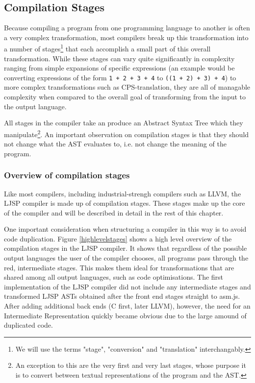 \documentclass[11pt]{report}
\begin{document}
\subsection{Compilation Stages}
Because compiling a program from one programming language to another is often a very complex transformation, most compilers break up this transformation into a number of stages\footnote{We will use the terms "stage", "conversion" and "translation" interchangably.} that each accomplish a small part of this overall transformation. While these stages can vary quite significantly in complexity ranging from simple expansions of specific expressions (an example would be converting expressions of the form \hbox{\texttt{1 + 2 + 3 + 4}} to \hbox{\texttt{((1 + 2) + 3) + 4}}) to more complex transformations such as CPS-translation, they are all of managable complexity when compared to the overall goal of transforming from the input to the output language.

All stages in the compiler take an produce an Abstract Syntax Tree which they manipulate\footnote{An exception to this are the very first and very last stages, whose purpose it is to convert between textual representations of the program and the AST.}. An important observation on compilation stages is that they should not change what the AST evaluates to, i.e. not change the meaning of the program.

\subsubsection{Overview of compilation stages}
Like most compilers, including industrial-strengh compilers such as LLVM, the LJSP compiler is made up of compilation stages. These stages make up the core of the compiler and will be described in detail in the rest of this chapter.

One important consideration when structuring a compiler in this way is to avoid code duplication. Figure \ref{highlevelstages} shows a high level overview of the compilation stages in the LJSP compiler. It shows that regardless of the possible output languages the user of the compiler chooses, all programs pass through the red, intermediate stages. This makes them ideal for transformations that are shared among all output languages, such as code optimisations. The first implementation of the LJSP compiler did not include any intermediate stages and transformed LJSP ASTs obtained after the front end stages straight to asm.js. After adding additional back ends (C first, later LLVM), however, the need for an Intermediate Representation quickly became obvious due to the large amound of duplicated code.
\end{document}

